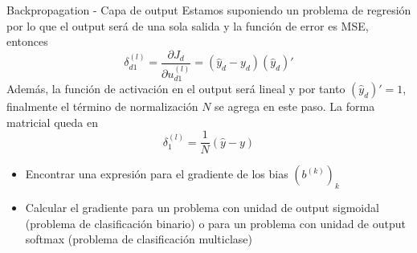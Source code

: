 \documentclass[handout, 9pt]{beamer}
\begin{document}
\begin{frame}{Backpropagation - Capa de output}
Estamos suponiendo un problema de regresión por lo que el output será de una sola salida y la función de error es MSE, entonces \pause
\[
\delta_{d1}^{(l)} = \frac{\partial J_d}{\partial u_{d1}^{(l)}} = (\hat{y}_d-y_d) (\hat{y}_d)' 
\] \pause
Además, la función de activación en el output será lineal y por tanto $(\hat{y}_d)' = 1$, finalmente el término de normalización $N$ se agrega en este paso.  La forma matricial queda en \pause
\[
\delta_{1}^{(l)} = \frac{1}{N}(\hat{y}-y)
\]
\pause
\begin{propuesto}
\begin{itemize}
  \item Encontrar una expresión para el gradiente de los bias $(b^{(k)})_k$
  \item Calcular el gradiente para un problema con unidad de output sigmoidal (problema de clasificación binario) o para un problema con unidad de output softmax (problema de clasificación multiclase) 
\end{itemize}
\end{propuesto}


\end{frame}
\end{document}

